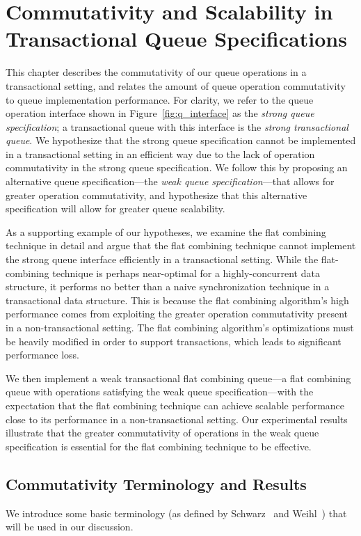 \chapter{Commutativity and Scalability in Transactional Queue Specifications}
\label{commutativity}

This chapter describes the commutativity of our queue operations in a transactional setting, and relates the amount of queue operation commutativity to queue implementation performance. For clarity, we refer to the queue operation interface shown in Figure~\ref{fig:q_interface} as the \emph{strong queue specification}; a transactional queue with this interface is the \emph{strong transactional queue}. We hypothesize that the strong queue specification cannot be implemented in a transactional setting in an efficient way due to the lack of operation commutativity in the strong queue specification. 
We follow this by proposing an alternative queue specification---the \emph{weak queue specification}---that allows for greater operation commutativity, and hypothesize that this alternative specification will allow for greater queue scalability.

As a supporting example of our hypotheses, we examine the flat combining technique in detail and argue that the flat combining technique cannot implement the strong queue interface efficiently in a transactional setting. While the flat-combining technique is perhaps near-optimal for a highly-concurrent data structure, it performs no better than a naive synchronization technique in a transactional data structure. This is because the flat combining algorithm's high performance comes from exploiting the greater operation commutativity present in a non-transactional setting. The flat combining algorithm's optimizations must be heavily modified in order to support transactions, which leads to significant performance loss. 

We then implement a weak transactional flat combining queue---a flat combining queue with operations satisfying the weak queue specification---with the expectation that the flat combining technique can achieve scalable performance close to its performance in a non-transactional setting. Our experimental results illustrate that the greater commutativity of operations in the weak queue specification is essential for the flat combining technique to be effective.

\section{Commutativity Terminology and Results}
We introduce some basic terminology (as defined by Schwarz~\cite{schwarz} and Weihl~\cite{weihl}) that will be used in our discussion.

